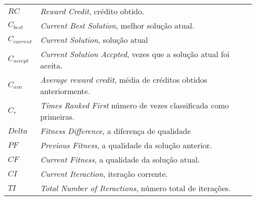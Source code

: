 

\begin{listasimb}

\begin{longtable}{ll}
$RC$ & \textit{Reward Credit}, crédito obtido.\\
$C_{best}$ & \textit{Current Best Solution}, melhor solução atual.\\
$C_{current}$ & \textit{Current Solution}, solução atual\\
$C_{accept}$ & \textit{Current Solution Accpted}, vezes que a solução atual foi aceita.\\
$C_{ava}$ & \textit{Average reward credit}, média de créditos obtidos anteriormente. \\
$C_r$ & \textit{Times Ranked First} número de vezes classificada como primeiras.\\

$Delta$ & \textit{Fitness Difference}, a diferença de qualidade\\
 $PF$ & \textit{Previous Fitness}, a qualidade da solução anterior.\\
 $CF$ & \textit{Current Fitness}, a qualidade da solução atual.\\
 
 $CI$ & \textit{Current Iteraction}, iteração corrente.\\
 $TI$ & \textit{Total Number of Iteractions}, número total de iterações.

\end{longtable}

\end{listasimb}

